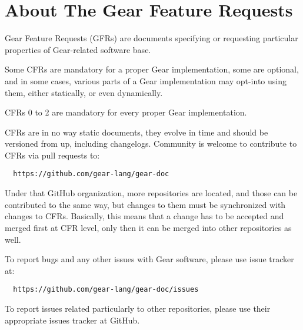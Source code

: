 
\chapter{About The Gear Feature Requests}
\label{sec:about}

Gear Feature Requests (GFRs) are documents specifying or requesting particular properties of Gear-related software base. 

Some CFRs are mandatory for a proper Gear implementation, some are optional, and in some cases, various parts of a Gear implementation may opt-into using them, either statically, or even dynamically. 

CFRs 0 to 2 are mandatory for every proper Gear implementation. 

CFRs are in no way static documents, they evolve in time and should be versioned from  up, including changelogs. Community is welcome to contribute to CFRs via pull requests to:

\begin{lstlisting}
  https://github.com/gear-lang/gear-doc
\end{lstlisting}

Under that GitHub organization, more repositories are located, and those can be contributed to the same way, but changes to them must be synchronized with changes to CFRs. Basically, this means that a change has to be accepted and merged first at CFR level, only then it can be merged into other repositories as well. 

To report bugs and any other issues with Gear software, please use issue tracker at:

\begin{lstlisting}
  https://github.com/gear-lang/gear-doc/issues
\end{lstlisting}

To report issues related particularly to other repositories, please use their appropriate issues tracker at GitHub. 






